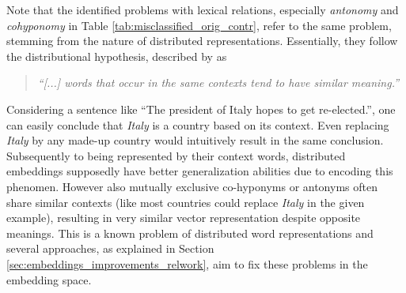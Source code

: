 \noindent
Note that the identified problems with lexical relations, especially \textit{antonomy} and \textit{cohyponomy} in Table \ref{tab:misclassified_orig_contr}, refer to the same problem, stemming from the nature of distributed representations. Essentially, they follow the distributional hypothesis, described by \cite{pantel2005inducing} as 
\begin{quotation}
\textit{``[...] words that occur in the same contexts tend to have similar meaning.''}\citep{pantel2005inducing}
\end{quotation}
Considering a sentence like ``The president of Italy hopes to get re-elected.'', one can easily conclude that \textit{Italy} is a country based on its context. Even replacing \textit{Italy} by any made-up country would intuitively result in the same conclusion. Subsequently to being represented by their context words, distributed embeddings supposedly have better generalization abilities \citep{lecun2015deep} due to encoding this phenomen. However also mutually exclusive co-hyponyms or antonyms often share similar contexts (like most countries could replace \textit{Italy} in the given example), resulting in very similar vector representation despite opposite meanings. This is a known problem \citep{sahlgren2008distributional} of distributed word representations and several approaches, as explained in Section \ref{sec:embeddings_improvements_relwork}, aim to fix these problems in the embedding space.